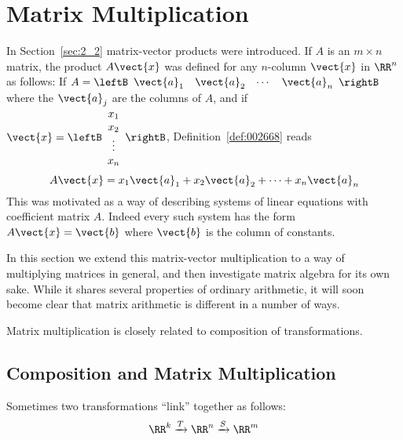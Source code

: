 \section{Matrix Multiplication}
\label{sec:2_3}

In Section~\ref{sec:2_2} matrix-vector products were introduced. If $A$ is an $m \times n$ matrix, the product $A\vect{x}$ was defined for any $n$-column $\vect{x}$ in $\RR^n$ as follows: If $A = \leftB \begin{array}{cccc}
\vect{a}_{1} & \vect{a}_{2} & \cdots & \vect{a}_{n}
\end{array} \rightB$ where the $\vect{a}_{j}$ are the columns of $A$, and if $\vect{x} = \leftB \begin{array}{c}
x_{1} \\
x_{2} \\
\vdots \\
x_{n}
\end{array} \rightB$,
 Definition~\ref{def:002668} reads
\begin{equation} \label{eq:mvectorprod}
A\vect{x} = x_{1}\vect{a}_{1} + x_{2}\vect{a}_{2} + \cdots + x_{n}\vect{a}_{n}
\end{equation}
This was motivated as a way of describing systems of linear equations with coefficient matrix $A$. Indeed every such system has the form $A\vect{x} = \vect{b}$ where $\vect{b}$ is the column of constants.

In this section we extend this matrix-vector multiplication to a way of multiplying matrices in general, and then investigate matrix algebra for its own sake. While it shares several properties of ordinary arithmetic, it will soon become clear that matrix arithmetic is different in a number of ways.

Matrix multiplication is closely related to composition of transformations.


\subsection*{Composition and Matrix Multiplication}

Sometimes two transformations ``link'' together as follows:
\begin{equation*}
\RR^{k} \xrightarrow{T} \RR^{n} \xrightarrow{S} \RR^{m}
\end{equation*}

